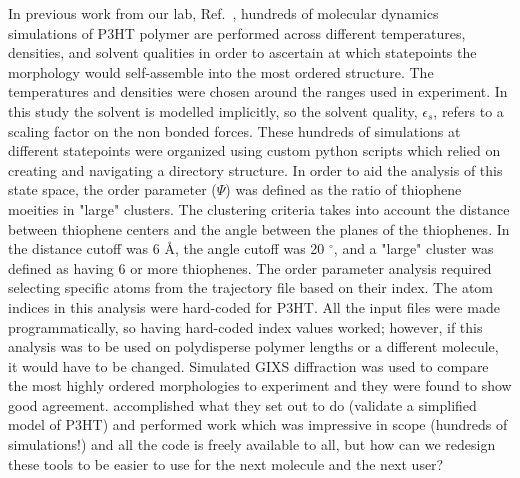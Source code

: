 In previous work from our lab, Ref.~\citet{Miller2018}, hundreds of molecular dynamics simulations of P3HT polymer are performed across different temperatures, densities, and solvent qualities in order to ascertain at which statepoints the morphology would self-assemble into the most ordered structure.
The temperatures and densities were chosen around the ranges used in experiment.
In this study the solvent is modelled implicitly, so the solvent quality, $\epsilon_{s}$, refers to a scaling factor on the non bonded forces.
These hundreds of simulations at different statepoints were organized using custom python scripts which relied on creating and navigating a directory structure.
In order to aid the analysis of this state space, the order parameter ($\Psi$) was defined as the ratio of thiophene moeities in "large" clusters.
The clustering criteria takes into account the distance between thiophene centers and the angle between the planes of the thiophenes.
In \citet{Miller2018} the distance cutoff was 6 \AA, the angle cutoff was 20 $^{\circ}$, and a "large" cluster was defined as having 6 or more thiophenes.
The order parameter analysis required selecting specific atoms from the trajectory file based on their index.
The atom indices in this analysis were hard-coded for P3HT.
All the input files were made programmatically, so having hard-coded index values worked; however, if this analysis was to be used on polydisperse polymer lengths or a different molecule, it would have to be changed.
Simulated GIXS diffraction was used to compare the most highly ordered morphologies to experiment and they were found to show good agreement.
\citet{Miller2018} accomplished what they set out to do (validate a simplified model of P3HT) and performed work which was impressive in scope (hundreds of simulations!) and all the code is freely available to all, but how can we redesign these tools to be easier to use for the next molecule and the next user?

